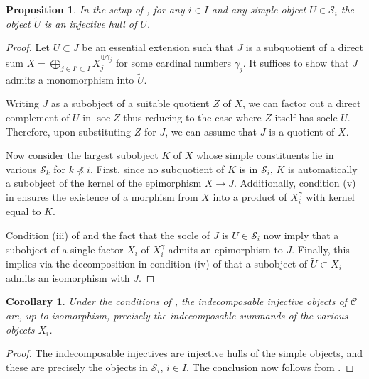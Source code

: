 \documentclass[11pt]{article}
\theoremstyle{plain}
\newtheorem{proposition}[lemma]{Proposition}
\newtheorem{corollary}[lemma]{Corollary}
\theoremstyle{nonumberplain}
\theoremstyle{plain}
\theoremstyle{nonumberplain}
\newtheorem{proof}{Proof}
\newcommand\cC{\mathcal C}
\newcommand\cS{\mathcal S}
\DeclareMathOperator{\soc}{\mathrm{soc}}
\begin{document}
\begin{proposition}\label{pr.inj-hull}
  In the setup of , for any $i\in I$ and any simple
  object $U\in \cS_i$ the object $\widetilde{U}$ is an injective hull
  of $U$.
\end{proposition}
\begin{proof}
  Let $U\subset J$ be an essential extension such that $J$ is a
  subquotient of a direct sum
  $X=\bigoplus\limits_{j\in I'\subset I} X_j^{\oplus {\gamma}_j}$ for
  some cardinal numbers ${\gamma}_j$. It suffices to show that $J$
  admits a monomorphism into $\widetilde{U}$.

  Writing $J$ as a subobject of a suitable quotient $Z$ of $X$, we can
  factor out a direct complement of $U$ in $\soc Z$ thus reducing to
  the case where $Z$ itself has socle $U$. Therefore, upon
  substituting $Z$ for $J$, we can assume that $J$ is a quotient of
  $X$.

  Now consider the largest subobject $K$ of $X$ whose simple
  constituents lie in various $\cS_k$ for $k{\npreceq} i$. First, since
  no subquotient of $K$ is in $\cS_i$, $K$ is automatically a
  subobject of the kernel of the epimorphism $X\to J$. Additionally,
  condition (v) in  ensures the existence of a
  morphism from $X$ into a product of $X_i^\gamma$ with kernel equal
  to $K$.

  Condition (iii) of  and the fact that the socle of
  $J$ is $U\in \cS_i$ now imply that a subobject of a single factor
  $X_i$ of $X_i^\gamma$ admits an epimorphism to $J$. Finally, this
  implies via the decomposition in condition (iv) of
   that a subobject of $\widetilde{U}\subset X_i$
  admits an isomorphism with $J$.
\end{proof}




\begin{corollary}\label{cor.indec-inj}
  Under the conditions of , the indecomposable injective objects
  of $\cC$ are, up to isomorphism, precisely the indecomposable summands of the various
  objects $X_i$. 
\end{corollary}
\begin{proof}
  The indecomposable injectives are injective hulls of the simple
  objects, and these are precisely the objects in $\cS_i$, $i\in
  I$. The conclusion now follows from . 
\end{proof}
\end{document}
